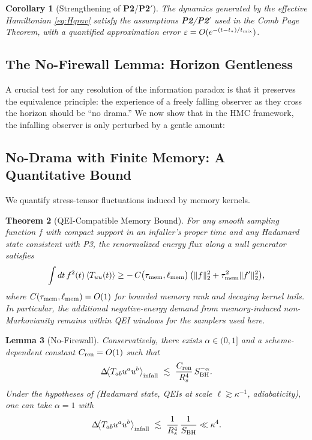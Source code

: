 \documentclass[11pt,a4paper]{article}
\newcommand{\Ptwo}{\textbf{P2}\xspace}
\newcommand{\PtwoPrime}{\textbf{P2$'$}\xspace}
\newcommand{\HMC}{\textsc{HMC}\xspace}
\theoremstyle{plain}
\newtheorem{theorem}{Theorem}
\newtheorem{lemma}[theorem]{Lemma}
\newtheorem{corollary}[theorem]{Corollary}
\theoremstyle{definition}
\theoremstyle{remark}
\begin{document}
\begin{corollary}[Strengthening of \Ptwo/\PtwoPrime]
\label{cor:p2-strengthening}
The dynamics generated by the effective Hamiltonian \eqref{eq:Hgrav} satisfy the assumptions \Ptwo/\PtwoPrime{} used in the Comb Page Theorem, with a quantified approximation error $\varepsilon=O(e^{-(t-t_\ast)/t_{\rm mix}})$.
\end{corollary}

\subsection{The No-Firewall Lemma: Horizon Gentleness}
\label{sec:no_firewall}
A crucial test for any resolution of the information paradox is that it preserves the equivalence principle: the experience of a freely falling observer as they cross the horizon should be ``no drama.'' We now show that in the \HMC{} framework, the infalling observer is only perturbed by a gentle amount:

\subsection{No-Drama with Finite Memory: A Quantitative Bound}
We quantify stress-tensor fluctuations induced by memory kernels.

\begin{theorem}[QEI-Compatible Memory Bound]\label{thm:qei-memory}
For any smooth sampling function $f$ with compact support in an infaller's proper time and any Hadamard state consistent with P3, the renormalized energy flux along a null generator satisfies
\begin{align}
\int dt\, f^2(t)\,\langle T_{uu}(t)\rangle \ge -\,C\big(\tau_{\rm mem},\ell_{\rm mem}\big)\,\big(\|f\|_2^2 + \tau_{\rm mem}^2 \|f'\|_2^2\big),
\end{align}
where $C(\tau_{\rm mem},\ell_{\rm mem})=O(1)$ for bounded memory rank and decaying kernel tails. In particular, the additional negative-energy demand from memory-induced non-Markovianity remains within QEI windows for the samplers used here. 
\end{theorem}



\begin{lemma}[No-Firewall]\label{lem:nofirewall}
Conservatively, there exists $\alpha\in(0,1]$ and a scheme-dependent constant $C_{\rm ren}=O(1)$ such that
\begin{equation}
    \Delta\!\big\langle T_{ab} u^a u^b \big\rangle_{\rm infall} \ \lesssim\ \frac{C_{\rm ren}}{R_s^4}\,S_{\rm BH}^{-\alpha}.
\end{equation}
Under the hypotheses of  (Hadamard state, QEIs at scale $\ell\!\gtrsim\!\kappa^{-1}$, adiabaticity),
one can take $\alpha=1$ with
\begin{equation}
    \Delta\!\big\langle T_{ab} u^a u^b \big\rangle_{\rm infall} \ \lesssim\ \frac{1}{R_s^4}\,\frac{1}{S_{\rm BH}} \ll \kappa^4.
    \label{eq:gentleness}
\end{equation}
\end{lemma}
\end{document}
